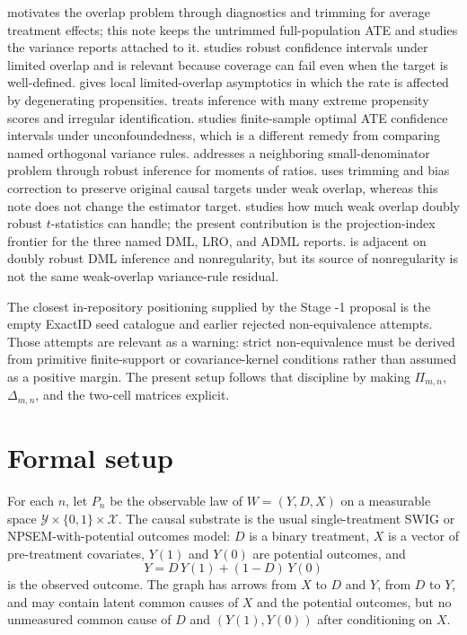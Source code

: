\documentclass[11pt]{article}
\theoremstyle{definition}
\theoremstyle{plain}
\theoremstyle{remark}
\begin{document}
\cite{CrumpHotzImbensMitnik2009} motivates the overlap problem through
diagnostics and trimming for average treatment effects; this note keeps the
untrimmed full-population ATE and studies the variance reports attached to it.
\cite{Rothe2017LimitedOverlapCI} studies robust confidence intervals under
limited overlap and is relevant because coverage can fail even when the target
is well-defined.  \cite{HongLeungLi2020} gives local limited-overlap
asymptotics in which the rate is affected by degenerating propensities.
\cite{HeilerKazak2021ExtremePS} treats inference with many extreme propensity
scores and irregular identification.  \cite{ArmstrongKolesar2021FiniteSampleATE}
studies finite-sample optimal ATE confidence intervals under unconfoundedness,
which is a different remedy from comparing named orthogonal variance rules.
\cite{SasakiUra2022MomentsRatios} addresses a neighboring small-denominator
problem through robust inference for moments of ratios.  \cite{MaSantAnnaSasakiUra2026WeakOverlapDR}
uses trimming and bias correction to preserve original causal targets under
weak overlap, whereas this note does not change the estimator target.
\cite{Dorn2025WeakOverlapDR} studies how much weak overlap doubly robust
\(t\)-statistics can handle; the present contribution is the projection-index
frontier for the three named DML, LRO, and ADML reports.  \cite{DukesVansteelandtWhitney2024DRDML}
is adjacent on doubly robust DML inference and nonregularity, but its source of
nonregularity is not the same weak-overlap variance-rule residual.

The closest in-repository positioning supplied by the Stage -1 proposal is the
empty ExactID seed catalogue and earlier rejected non-equivalence attempts.
Those attempts are relevant as a warning: strict non-equivalence must be
derived from primitive finite-support or covariance-kernel conditions rather
than assumed as a positive margin.  The present setup follows that discipline
by making \(\Pi_{m,n}\), \(\Delta_{m,n}\), and the two-cell matrices explicit.

\section{Formal setup}
For each \(n\), let \(P_n\) be the observable law of
\(W=(Y,D,X)\) on a measurable space \(\mathcal Y\times\{0,1\}\times\mathcal X\).
The causal substrate is the usual single-treatment SWIG or NPSEM-with-potential
outcomes model: \(D\) is a binary treatment, \(X\) is a vector of pre-treatment
covariates, \(Y(1)\) and \(Y(0)\) are potential outcomes, and
\[
  Y=D\,Y(1)+(1-D)\,Y(0)
\]
is the observed outcome.  The graph has arrows from \(X\) to \(D\) and \(Y\),
from \(D\) to \(Y\), and may contain latent common causes of \(X\) and the
potential outcomes, but no unmeasured common cause of \(D\) and
\((Y(1),Y(0))\) after conditioning on \(X\).
\end{document}

